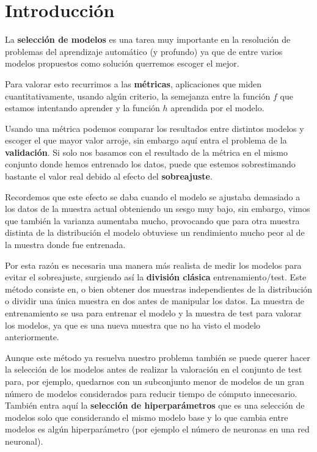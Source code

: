 
\chapter{Introducción}\label{ch:pv-introduccion}

La \textbf{selección de modelos} es una tarea muy importante en la resolución de problemas del aprendizaje automático (y profundo) ya que de entre varios modelos propuestos como solución querremos escoger el mejor.

Para valorar esto recurrimos a las \textbf{métricas}, aplicaciones que miden cuantitativamente, usando algún criterio, la semejanza entre la función $f$ que estamos intentando aprender y la función $h$ aprendida por el modelo.

Usando una métrica podemos comparar los resultados entre distintos modelos y escoger el que mayor valor arroje, sin embargo aquí entra el problema de la \textbf{validación}. Si solo nos basamos con el resultado de la métrica en el mismo conjunto donde hemos entrenado los datos, puede que estemos sobrestimando bastante el valor real debido al efecto del \textbf{sobreajuste}.

Recordemos que este efecto se daba cuando el modelo se ajustaba demasiado a los datos de la muestra actual obteniendo un sesgo muy bajo, sin embargo, vimos que también la varianza aumentaba mucho, provocando que para otra muestra distinta de la distribución el modelo obtuviese un rendimiento mucho peor al de la muestra donde fue entrenada.

Por esta razón es necesaria una manera más realista de medir los modelos para evitar el sobreajuste, surgiendo así la \textbf{división clásica} entrenamiento/test. Este método consiste en, o bien obtener dos muestras independientes de la distribución o dividir una única muestra en dos antes de manipular los datos. La muestra de entrenamiento se usa para entrenar el modelo y la muestra de test para valorar los modelos, ya que es una nueva muestra que no ha visto el modelo anteriormente.

Aunque este método ya resuelva nuestro problema también se puede querer hacer la selección de los modelos antes de realizar la valoración en el conjunto de test para, por ejemplo, quedarnos con un subconjunto menor de modelos de un gran número de modelos considerados para reducir tiempo de cómputo innecesario. También entra aquí la \textbf{selección de hiperparámetros} que es una selección de modelos solo que considerando el mismo modelo base y lo que cambia entre modelos es algún hiperparámetro (por ejemplo el número de neuronas en una red neuronal).

